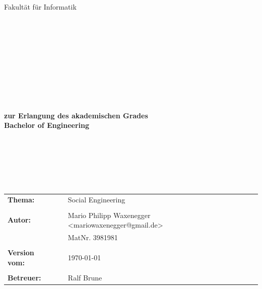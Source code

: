 \begin{center}
\Large{Fakultät für Informatik}
\end{center}
\begin{verbatim}




\end{verbatim}
\begin{center}
\doublespacing
\textbf{\LARGE{\titleDocument}}\\
\singlespacing
\begin{verbatim}

\end{verbatim}
\textbf{{~\subjectDocument}}
\end{center}
\begin{verbatim}

\end{verbatim}
\begin{center}

\end{center}
\begin{verbatim}

\end{verbatim}
\begin{center}
\textbf{zur Erlangung des akademischen Grades \\ Bachelor of Engineering}
\end{center}
\begin{verbatim}






\end{verbatim}
\begin{flushleft}
\begin{tabular}{llll}
\textbf{Thema:} & & Social Engineering & \\
& & \\
\textbf{Autor:} & & Mario Philipp Waxenegger <mariowaxenegger@gmail.de>& \\
& & MatNr. 3981981 & \\
& & \\
\textbf{Version vom:} & & \today &\\
& & \\
\textbf{Betreuer:} & & Ralf Brune &\\
\end{tabular}
\end{flushleft}